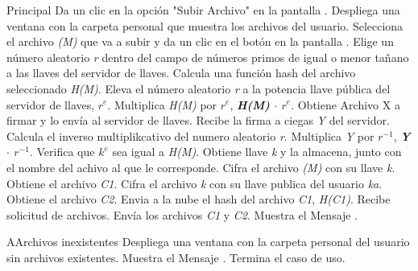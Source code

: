 \begin{UCtrayectoria}{Principal}
	\UCpaso[\UCactor] Da un clic en la opción "Subir Archivo" en la pantalla .
	\UCpaso Despliega una ventana con la carpeta personal que muestra los archivos del usuario. 
	\UCpaso[\UCactor] Selecciona el archivo \textit{(M)} que va a subir y da un clic en el botón \IUbuttonAceptar en la pantalla . 
	\UCpaso Elige un número aleatorio \textit{r} dentro del campo de números primos de igual o menor tañano a las llaves del servidor de llaves.  \label{CUCL2Regreso}
	\UCpaso Calcula una función hash del archivo seleccionado \textit{H(M)}.
	\UCpaso Eleva el número aleatorio \textit{r} a la potencia llave pública del servidor de llaves,  \textit{$r^{e}$}. 
	\UCpaso Multiplica \textit{H(M)} por \textit{$r^{e}$}, \textbf{\textit{H(M)} $\cdot$ \textit{$r^{e}$}}.
	\UCpaso Obtiene Archivo X a firmar y lo envía al servidor de llaves.
	\UCpaso Recibe la firma a ciegas \textit{Y} del servidor.
	\UCpaso Calcula el inverso multiplikcativo del numero aleatorio \textit{r}.
	\UCpaso Multiplica \textit{Y} por \textit{$r^{-1}$}, \textbf{\textit{Y} $\cdot$ \textit{$r^{-1}$}}.
	\UCpaso Verifica que \textit{$k^{e}$} sea igual a \textit{H(M)}.  
	\UCpaso Obtiene llave \textit{k} y la almacena, junto con el nombre del achivo al que le corresponde.
	\UCpaso Cifra el archivo \textit{(M)} con su llave \textit{k}.
	\UCpaso Obtiene el archivo \textit{C1}.
	\UCpaso Cifra el archivo \textit{k} con su llave publica del usuario \textit{ka}.
	\UCpaso Obtiene el archivo \textit{C2}.
	\UCpaso Envia a la nube el hash del archivo \textit{C1}, \textit{H(C1)}.
	\UCpaso Recibe solicitud de archivos. 
	\UCpaso Envía los archivos \textit{C1} y \textit{C2}.
	\UCpaso Muestra el Mensaje . \label{CUCL2Regreso2}
	

\end{UCtrayectoria}


		
\begin{UCtrayectoriaA}{A}{Archivos inexistentes}
	\UCpaso Despliega una ventana con la carpeta personal del usuario sin archivos existentes.
	\UCpaso Muestra el Mensaje .
	\UCpaso Termina el caso de uso.
\end{UCtrayectoriaA}

